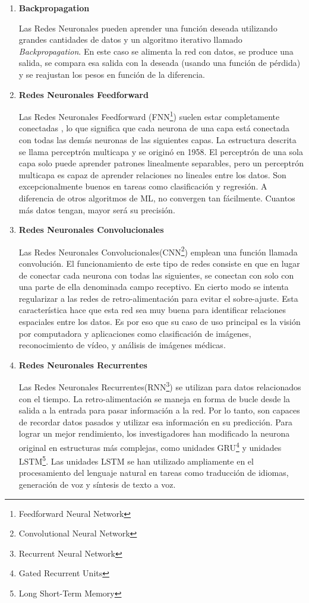 \begin{enumerate}[label=\textbf{\arabic*})]
	
	\item \textbf{Backpropagation}
	
	Las Redes Neuronales pueden aprender una función deseada utilizando grandes cantidades de datos y un algoritmo iterativo llamado \textit{Backpropagation}.  En este caso se alimenta la red con datos, se produce una salida, se compara esa salida con la deseada (usando una función de pérdida) y se reajustan los pesos en función de la diferencia\cite{Karagiannakos2020}.
	
	\item \textbf{Redes Neuronales Feedforward }
	
	Las Redes Neuronales Feedforward (FNN\footnote{Feedforward Neural Network}) suelen estar completamente conectadas , lo que significa que cada neurona de una capa está conectada con todas las demás neuronas de las siguientes capas. La estructura descrita se llama perceptrón multicapa y se originó en 1958. El perceptrón de una sola capa solo puede aprender patrones linealmente separables, pero un perceptrón multicapa es capaz de aprender relaciones no lineales entre los datos. Son excepcionalmente buenos en tareas como clasificación y regresión. A diferencia de otros algoritmos de ML, no convergen tan fácilmente. Cuantos más datos tengan, mayor será su precisión\cite{Karagiannakos2020}.
	
	\item \textbf{Redes Neuronales Convolucionales}
	
	Las Redes Neuronales Convolucionales(CNN\footnote{Convolutional Neural Network}) emplean una función llamada convolución. El funcionamiento de este tipo de redes consiste en que en lugar de conectar cada neurona con todas las siguientes, se conectan con solo con una parte de ella denominada campo receptivo. En cierto modo se intenta regularizar a las redes de retro-alimentación para evitar el sobre-ajuste. Esta característica hace que esta red sea muy buena para identificar relaciones espaciales entre los datos. Es por eso que su caso de uso principal es la visión por computadora y aplicaciones como clasificación de imágenes, reconocimiento de vídeo, y análisis de imágenes médicas\cite{Karagiannakos2020}.
	
	\item \textbf{Redes Neuronales Recurrentes}
	
	Las Redes Neuronales Recurrentes(RNN\footnote{Recurrent Neural Network}) se utilizan para datos relacionados con el tiempo. La retro-alimentación se maneja en forma de bucle desde la salida a la entrada para pasar información a la red. Por lo tanto, son capaces de recordar datos pasados y utilizar esa información en su predicción. Para lograr un mejor rendimiento, los investigadores han modificado la neurona original en estructuras más complejas, como unidades GRU\footnote{Gated Recurrent Units} y unidades LSTM\footnote{Long Short-Term Memory}. Las unidades LSTM se han utilizado ampliamente en el procesamiento del lenguaje natural en tareas como traducción de idiomas, generación de voz y síntesis de texto a voz\cite{Karagiannakos2020}.
	

\end{enumerate}
